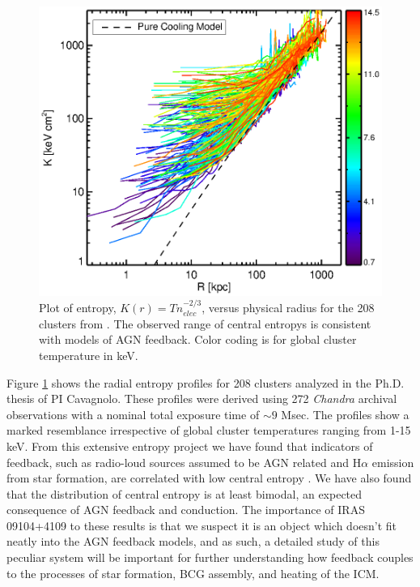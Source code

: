 \documentclass[letterpaper,11pt,twocolumn]{article}
\begin{document}
\begin{figure}
\begin{center}
\includegraphics*[width=\columnwidth, trim=28mm 10mm 30mm 17mm, clip]{splots}
\caption{
Plot of entropy, $K(r) = Tn_{elec}^{-2/3}$, versus physical radius for
the 208 clusters from \cite{accept1}. The observed range of central
entropys is consistent with models of AGN feedback. Color coding is
for global cluster temperature in keV.
}
\label{fig:ent}
\end{center}
\end{figure}

Figure \ref{fig:ent} shows the radial entropy profiles for 208
clusters analyzed in the Ph.D. thesis of PI Cavagnolo. These
profiles were derived using 272 {\it{Chandra}} archival observations
with a nominal total exposure time of $\sim9$ Msec. The profiles show
a marked resemblance irrespective of global cluster temperatures
ranging from 1-15 keV. From this extensive entropy project we have found
that indicators of feedback, such as radio-loud sources assumed to be
AGN related and H$\alpha$ emission from star formation, are correlated
with low central entropy \citep{accept2}. We have also found that the
distribution of central entropy is at least bimodal, an expected
consequence of AGN feedback and conduction. The importance of
IRAS 09104+4109 to these results is that we suspect it is an object
which doesn't fit neatly into the AGN feedback models, and as such, a
detailed study of this peculiar system will be important for further
understanding how feedback couples to the processes of star formation,
BCG assembly, and heating of the ICM.\\
\end{document}
